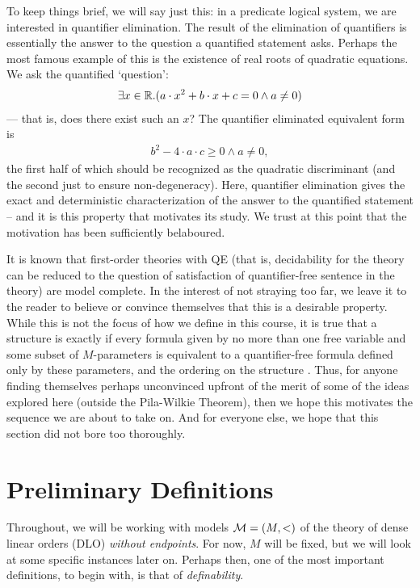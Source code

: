 To keep things brief, we will say just this: in a predicate logical system, we are interested in quantifier elimination. The result of the elimination of quantifiers is essentially the answer to the question a quantified statement asks. Perhaps the most famous example of this is the existence of real roots of quadratic equations. We ask the quantified `question':
\begin{align}
  \exists x \in \mathbb{R} . (a \cdot x^2 + b \cdot x + c = 0 \wedge a \neq 0)
\end{align}
— that is, does there exist such an $x$? The quantifier eliminated equivalent form is
\begin{align}
  b^2 - 4 \cdot a \cdot c \geq 0 \wedge a \neq 0,
\end{align}
the first half of which should be recognized as the quadratic discriminant (and the second just to ensure non-degeneracy). Here, quantifier elimination gives the exact and deterministic characterization of the answer to the quantified statement -- and it is this property that motivates its study. We trust at this point that the motivation has been sufficiently belaboured.

It is known that first-order theories with QE (that is, decidability for the theory can be reduced to the question of satisfaction of quantifier-free sentence in the theory) are model complete. In the interest of not straying too far, we leave it to the reader to believe or convince themselves that this is a desirable property. While this is not the focus of how we define \omy in this course, it is true that a structure is \om exactly if every formula given by no more than one free variable and some subset of $M$-parameters is equivalent to a quantifier-free formula defined only by these parameters, and the ordering on the structure \cite{marker_model_2002}. Thus, for anyone finding themselves perhaps unconvinced upfront of the merit of some of the ideas explored here (outside the Pila-Wilkie Theorem), then we hope this motivates the sequence we are about to take on. And for everyone else, we hope that this section did not bore too thoroughly.


\section{Preliminary Definitions}
\label{sec:prelim-defns}
Throughout, we will be working with models $ \mathcal{M} = (M, <)$ of the theory of dense linear orders (DLO) \emph{without endpoints}. For now, $M$ will be fixed, but we will look at some specific instances later on. Perhaps then, one of the most important definitions, to begin with, is that of \emph{definability}.


